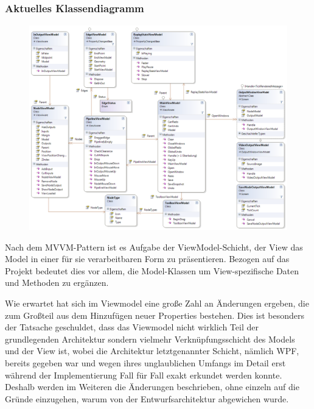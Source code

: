 \subsection{}

\subsubsection*{Aktuelles Klassendiagramm}
\begin{figure}[h!]
\begin{center}
\includegraphics[width=\textwidth]{classdiagram/viewmodel.png}
\end{center}
\end{figure}
Nach dem MVVM-Pattern ist es Aufgabe der ViewModel-Schicht, der View das Model in einer für sie verarbeitbaren Form zu präsentieren. Bezogen auf das Projekt bedeutet dies vor allem, die Model-Klassen um View-spezifische Daten und Methoden zu ergänzen.
\newpage

Wie erwartet hat sich im Viewmodel eine große Zahl an Änderungen ergeben, die zum Großteil aus dem Hinzufügen neuer Properties bestehen. Dies ist besonders der Tatsache geschuldet, dass das Viewmodel nicht wirklich Teil der grundlegenden Architektur sondern vielmehr Verknüpfungsschicht des Models und der View ist, wobei die Architektur letztgenannter Schicht, nämlich WPF, bereits gegeben war und wegen ihres unglaublichen Umfangs im Detail erst während der Implementierung Fall für Fall exakt erkundet werden konnte. Deshalb werden im Weiteren die Änderungen beschrieben, ohne einzeln auf die Gründe einzugehen, warum von der Entwurfsarchitektur abgewichen wurde.

